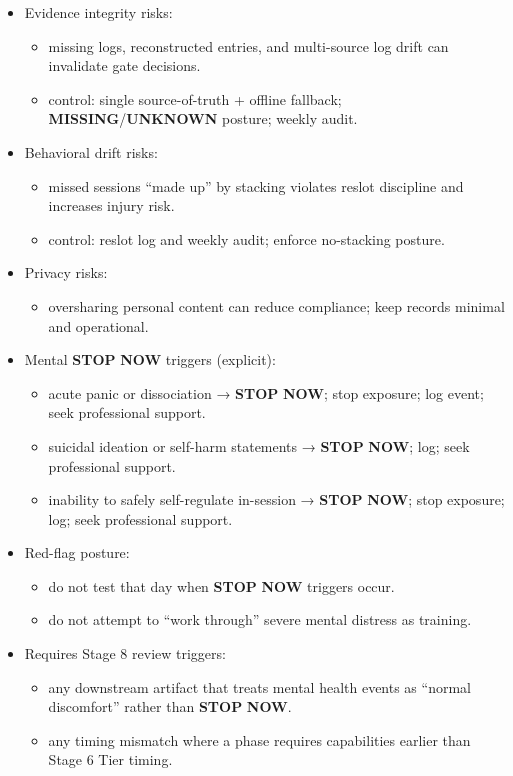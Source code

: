 \documentclass[10pt]{article}
\begin{document}
\begin{itemize}
\item Evidence integrity risks:
  \begin{itemize}
  \item missing logs, reconstructed entries, and multi-source log drift can invalidate gate decisions.
  \item control: single source-of-truth + offline fallback; \textbf{MISSING}/\textbf{UNKNOWN} posture; weekly audit.
  \end{itemize}
\item Behavioral drift risks:
  \begin{itemize}
  \item missed sessions “made up” by stacking violates reslot discipline and increases injury risk.
  \item control: reslot log and weekly audit; enforce no-stacking posture.
  \end{itemize}
\item Privacy risks:
  \begin{itemize}
  \item oversharing personal content can reduce compliance; keep records minimal and operational.
  \end{itemize}
\item Mental \textbf{STOP} \textbf{NOW} triggers (explicit):
  \begin{itemize}
  \item acute panic or dissociation → \textbf{STOP} \textbf{NOW}; stop exposure; log event; seek professional support.
  \item suicidal ideation or self-harm statements → \textbf{STOP} \textbf{NOW}; log; seek professional support.
  \item inability to safely self-regulate in-session → \textbf{STOP} \textbf{NOW}; stop exposure; log; seek professional support.
  \end{itemize}
\item Red-flag posture:
  \begin{itemize}
  \item do not test that day when \textbf{STOP} \textbf{NOW} triggers occur.
  \item do not attempt to “work through” severe mental distress as training.
  \end{itemize}
\item Requires Stage 8 review triggers:
  \begin{itemize}
  \item any downstream artifact that treats mental health events as “normal discomfort” rather than \textbf{STOP} \textbf{NOW}.
  \item any timing mismatch where a phase requires capabilities earlier than Stage 6 Tier timing.
  \end{itemize}
\end{itemize}
\end{document}
